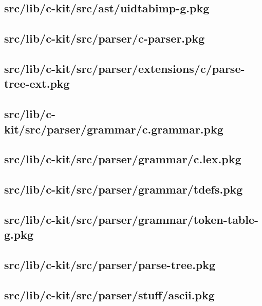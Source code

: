 \subsection{src/lib/c-kit/src/ast/uidtabimp-g.pkg}


\subsection{src/lib/c-kit/src/parser/c-parser.pkg}


\subsection{src/lib/c-kit/src/parser/extensions/c/parse-tree-ext.pkg}


\subsection{src/lib/c-kit/src/parser/grammar/c.grammar.pkg}


\subsection{src/lib/c-kit/src/parser/grammar/c.lex.pkg}


\subsection{src/lib/c-kit/src/parser/grammar/tdefs.pkg}


\subsection{src/lib/c-kit/src/parser/grammar/token-table-g.pkg}


\subsection{src/lib/c-kit/src/parser/parse-tree.pkg}


\subsection{src/lib/c-kit/src/parser/stuff/ascii.pkg}


